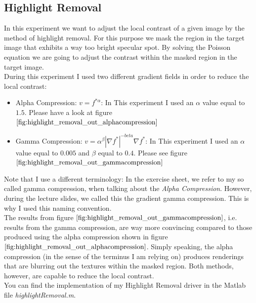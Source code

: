 \documentclass{paper}
\begin{document}
\subsection{Highlight Removal}

In this experiment we want to adjust the local contrast of a given image by the method of highlight removal. For this purpose we mask the region in the target image that exhibits a way too bright specular spot. By solving the Poisson equation we are going to adjust the contrast within the masked region in the target image. \\

During this experiment I used two different gradient fields in order to reduce the local contrast:

\begin{itemize}
\item Alpha Compression: $v = f^{* \alpha}$: In This experiment I used an $\alpha$ value equal to $1.5$. Please have a look at figure $\ref{fig:highlight_removal_out_alphacompression}$
\item Gamma Compression: $v = \alpha^{\beta} |\nabla f^{*}|^{-beta} \nabla f^{*}$: In This experiment I used an $\alpha$ value equal to $0.005$ and $\beta$ equal to $0.4$. Please see figure $\ref{fig:highlight_removal_out_gammacompression}$

\end{itemize}

Note that I use a different terminology: In the exercise sheet, we refer to my so called gamma compression, when talking about the \emph{Alpha Compression}. However, during the lecture slides, we called this the gradient gamma compression. This is why I used this naming convention. \\

The results from figure $\ref{fig:highlight_removal_out_gammacompression}$, i.e. results from the gamma compression, are way more convincing compared to those produced using the alpha compression shown in figure $\ref{fig:highlight_removal_out_alphacompression}$. Simply speaking, the alpha compression (in the sense of the terminus I am relying on) produces renderings that are blurring out the textures within the masked region. Both methods, however, are capable to reduce the local contrast. \\

You can find the implementation of my Highlight Removal driver in the Matlab file \emph{highlightRemoval.m}.
\end{document}
